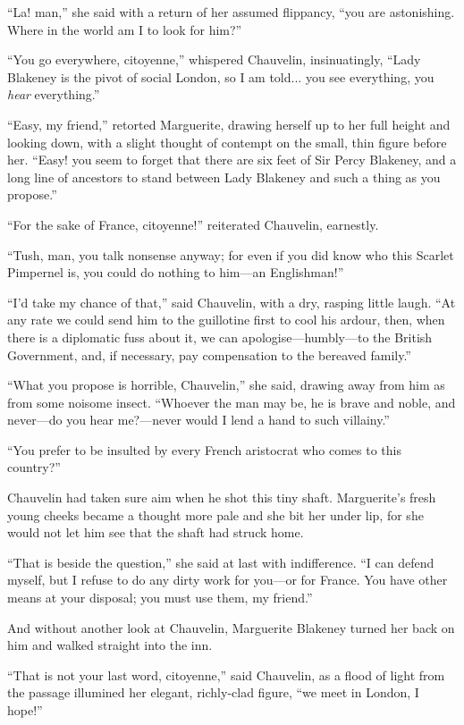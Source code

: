 \documentclass[paper=5.5in:8.5in,BCOR=7mm,twoside,DIV=calc,12pt,usegeometry,chapterprefix,endperiod,headings=big]{scrbook}
\begin{document}
\enquote{La! man,} she said with a return of her assumed flippancy, \enquote{you are astonishing. Where in the world am I to look for him?}

\enquote{You go everywhere, citoyenne,} whispered Chauvelin, insinuatingly, \enquote{Lady Blakeney is the pivot of social London, so I am told... you see everything, you \textit{hear} everything.}

\enquote{Easy, my friend,} retorted Marguerite, drawing herself up to her full height and looking down, with a slight thought of contempt on the small, thin figure before her. \enquote{Easy! you seem to forget that there are six feet of Sir Percy Blakeney, and a long line of ancestors to stand between Lady Blakeney and such a thing as you propose.}

\enquote{For the sake of France, citoyenne!} reiterated Chauvelin, earnestly.

\enquote{Tush, man, you talk nonsense anyway; for even if you did know who this Scarlet Pimpernel is, you could do nothing to him---an Englishman!}

\enquote{I'd take my chance of that,} said Chauvelin, with a dry, rasping little laugh. \enquote{At any rate we could send him to the guillotine first to cool his ardour, then, when there is a diplomatic fuss about it, we can apologise---humbly---to the British Government, and, if necessary, pay compensation to the bereaved family.}

\enquote{What you propose is horrible, Chauvelin,} she said, drawing away from him as from some noisome insect. \enquote{Whoever the man may be, he is brave and noble, and never---do you hear me?---never would I lend a hand to such villainy.}

\enquote{You prefer to be insulted by every French aristocrat who comes to this country?}

Chauvelin had taken sure aim when he shot this tiny shaft. Marguerite's fresh young cheeks became a thought more pale and she bit her under lip, for she would not let him see that the shaft had struck home.

\enquote{That is beside the question,} she said at last with indifference. \enquote{I can defend myself, but I refuse to do any dirty work for you---or for France. You have other means at your disposal; you must use them, my friend.}

And without another look at Chauvelin, Marguerite Blakeney turned her back on him and walked straight into the inn.

\enquote{That is not your last word, citoyenne,} said Chauvelin, as a flood of light from the passage illumined her elegant, richly-clad figure, \enquote{we meet in London, I hope!}
\end{document}
